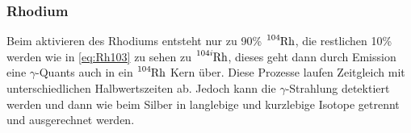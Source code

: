 \subsubsection{Rhodium}

\noindent Beim aktivieren des Rhodiums entsteht nur zu 90\% $\ce{^{104}\text{Rh}}$, die restlichen 10\% werden wie in \ref{eq:Rh103} zu sehen
zu $\ce{^{104i}\text{Rh}}$, dieses geht dann durch Emission eine $\gamma$-Quants auch in ein $\ce{^{104}\text{Rh}}$ Kern über. Diese Prozesse 
laufen Zeitgleich mit unterschiedlichen Halbwertszeiten ab. Jedoch kann die $\gamma$-Strahlung detektiert werden und dann wie beim Silber in 
langlebige und kurzlebige Isotope getrennt und ausgerechnet werden. 



%
%
